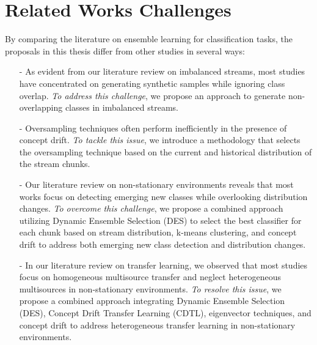 \section{Related Works Challenges} 
\label{sec:3_7_remartks}

By comparing the literature on ensemble learning for classification tasks, the proposals in this thesis differ from other studies in several ways:

\begin{enumerate}
    
    \item [-] As evident from our literature review on imbalanced streams, most studies have concentrated on generating synthetic samples while ignoring class overlap. \textit{To address this challenge}, we propose an approach to generate non-overlapping classes in imbalanced streams.

    \item [-] Oversampling techniques often perform inefficiently in the presence of concept drift. \textit{To tackle this issue}, we introduce a methodology that selects the oversampling technique based on the current and historical distribution of the stream chunks.
    
    \item [-] Our literature review on non-stationary environments reveals that most works focus on detecting emerging new classes while overlooking distribution changes. \textit{To overcome this challenge}, we propose a combined approach utilizing Dynamic Ensemble Selection (DES) to select the best classifier for each chunk based on stream distribution, k-means clustering, and concept drift to address both emerging new class detection and distribution changes.
    
    \item [-] In our literature review on transfer learning, we observed that most studies focus on homogeneous multisource transfer and neglect heterogeneous multisources in non-stationary environments. \textit{To resolve this issue}, we propose a combined approach integrating Dynamic Ensemble Selection (DES), Concept Drift Transfer Learning (CDTL), eigenvector techniques, and concept drift to address heterogeneous transfer learning in non-stationary environments.

\end{enumerate}
